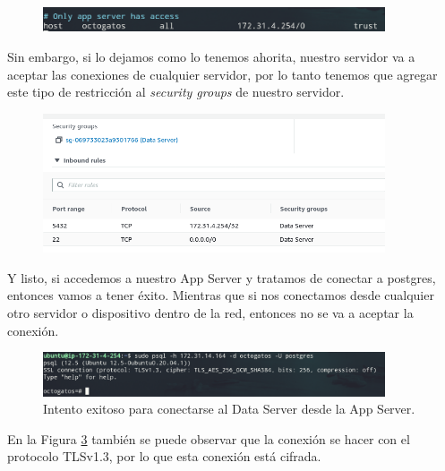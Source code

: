 \documentclass{article}
\begin{document}
\begin{figure}[H]
  \centering
  \includegraphics[width=0.9\textwidth]{DATASERVER/exhibitJ}
  \label{fig:DATASERVER-J}
\end{figure}

Sin embargo, si lo dejamos como lo tenemos ahorita, nuestro
servidor va a aceptar las conexiones de cualquier servidor,
por lo tanto tenemos que agregar este tipo de restricción
al \textit{security groups} de nuestro servidor.

\begin{figure}[H]
  \centering
  \includegraphics[width=0.9\textwidth]{DATASERVER/exhibitK}
  \label{fig:DATASERVER-K}
\end{figure}

Y listo, si accedemos a nuestro App Server y tratamos de
conectar a postgres, entonces vamos a tener éxito. Mientras
que si nos conectamos desde cualquier otro servidor o
dispositivo dentro de la red, entonces no se va a aceptar la
conexión.

\begin{figure}[H]
  \centering
  \includegraphics[width=0.9\textwidth]{DATASERVER/exhibitL}
  \caption{Intento exitoso para conectarse al Data Server desde la App Server.}
  \label{fig:DATASERVER-L}
\end{figure}

En la Figura \ref{fig:DATASERVER-L} tambi\'en se
puede observar que la conexi\'on se hacer con el protocolo
TLSv1.3, por lo que esta conexi\'on est\'a cifrada.




\end{document}
